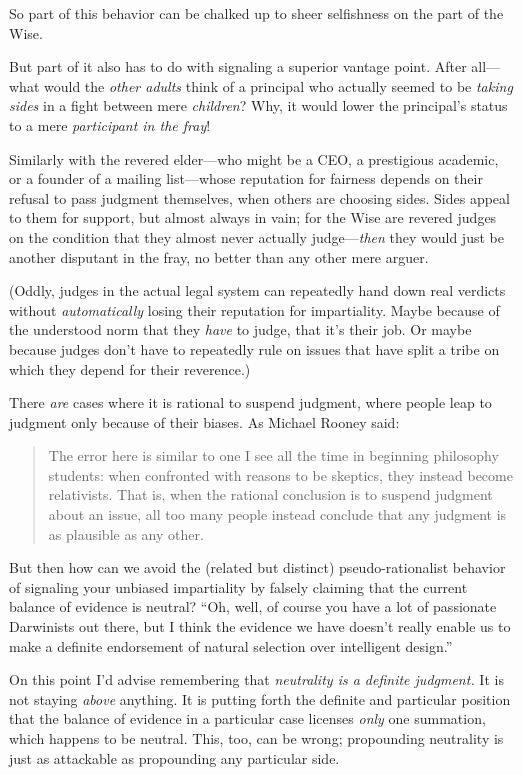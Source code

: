 {
 So part of this behavior can be chalked up to sheer selfishness on
the part of the Wise.}

{
 But part of it also has to do with signaling a superior vantage
point. After all---what would the \textit{other adults} think of a
principal who actually seemed to be \textit{taking sides} in a fight
between mere \textit{children}? Why, it would lower the
principal's status to a mere \textit{participant in the
fray}!}

{
 Similarly with the revered elder---who might be a CEO, a
prestigious academic, or a founder of a mailing list---whose reputation
for fairness depends on their refusal to pass judgment themselves, when
others are choosing sides. Sides appeal to them for support, but almost
always in vain; for the Wise are revered judges on the condition that
they almost never actually judge---\textit{then} they would just be
another disputant in the fray, no better than any other mere arguer.}

{
 (Oddly, judges in the actual legal system can repeatedly hand down
real verdicts without \textit{automatically} losing their reputation
for impartiality. Maybe because of the understood norm that they
\textit{have} to judge, that it's their job. Or maybe
because judges don't have to repeatedly rule on issues
that have split a tribe on which they depend for their reverence.)}

{
 There \textit{are} cases where it is rational to suspend judgment,
where people leap to judgment only because of their biases. As Michael
Rooney said:}

\begin{quote}
{
 The error here is similar to one I see all the time in beginning
philosophy students: when confronted with reasons to be skeptics, they
instead become relativists. That is, when the rational conclusion is to
suspend judgment about an issue, all too many people instead conclude
that any judgment is as plausible as any other.}
\end{quote}

{
 But then how can we avoid the (related but distinct)
pseudo-rationalist behavior of signaling your unbiased impartiality by
falsely claiming that the current balance of evidence is neutral?
``Oh, well, of course you have a lot of passionate
Darwinists out there, but I think the evidence we have
doesn't really enable us to make a definite endorsement
of natural selection over intelligent design.''}

{
 On this point I'd advise remembering that
\textit{neutrality is a definite judgment.} It is not staying
\textit{above} anything. It is putting forth the definite and
particular position that the balance of evidence in a particular case
licenses \textit{only} one summation, which happens to be neutral.
This, too, can be wrong; propounding neutrality is just as attackable
as propounding any particular side.}

